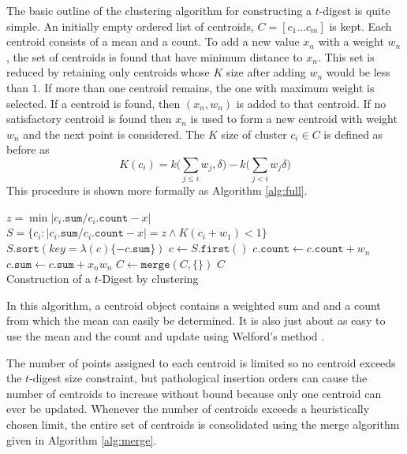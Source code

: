 \documentclass[11pt]{amsart}
\begin{document}
The basic outline of the clustering algorithm for constructing a $t$-digest is quite simple.  An initially empty ordered list of centroids, $C = [ c_1 \ldots c_m ]$ is kept.  Each centroid consists of a mean and a count.  To add a new value $x_n$ with a weight $w_n$, the set of centroids is found that have minimum distance to $x_n$.  This set is reduced by retaining only centroids whose $K$ size after adding $w_n$ would be less than $1$.  If more than one centroid remains, the one with maximum weight is selected.  If a centroid is found, then $(x_n,w_n)$ is added to that centroid. If no satisfactory centroid is found then $x_n$ is used to form a new centroid with weight $w_n$ and the next point is considered. The $K$ size of cluster $c_i \in C$ is defined as before as
\[
K(c_i) = k \big( \sum_{j \le i} w_j , \delta \big) - k \big(\sum_{j < i} w_j \delta\big)
\]
This procedure is shown more formally as Algorithm \ref{alg:full}.
 \begin{algorithm}[htb]
 \label{alg:full}
\SetNoFillComment
{}
 {
  $z = \min | c_i.\mathtt{sum}/c_i.\mathtt{count} - x |$\;
  $S = \lbrace c_i  :  |c_i.\mathtt{sum}/c_i.\mathtt{count} - x| = z \wedge K(c_i+w_1) < 1 \rbrace $\;
   {
       $S.\mathtt{sort}( key=\lambda (c) \lbrace -c.\mathtt{sum} \rbrace)$\;
       $c \gets S.\mathtt{first()}$ \;
       $c.\mathtt{count} \gets c.\mathtt{count} + w_n$\;
       $c.\mathtt{sum} \gets c.\mathtt{sum} + x_n w_n$\;
     } 
       {
         $C \gets \mathtt{merge}( C, \lbrace\rbrace ) $\;
       }
} 
\Return $ C $\\
\caption{Construction of a $t$-Digest by clustering}
\end{algorithm}

In this algorithm, a centroid object contains a weighted sum and and a count from which the mean can easily be determined.  It is also just about as easy to use the mean and the count and update using Welford's method \cite{wiki:welford, knuth2welford, welford62}.

The number of points assigned to each centroid is limited so no centroid exceeds the $t$-digest size constraint, but pathological insertion orders can cause the number of centroids to increase without bound because only one centroid can ever be updated. Whenever the number of centroids exceeds a heuristically chosen limit, the entire set of centroids is consolidated using the merge algorithm given in Algorithm \ref{alg:merge}.  
\end{document}
